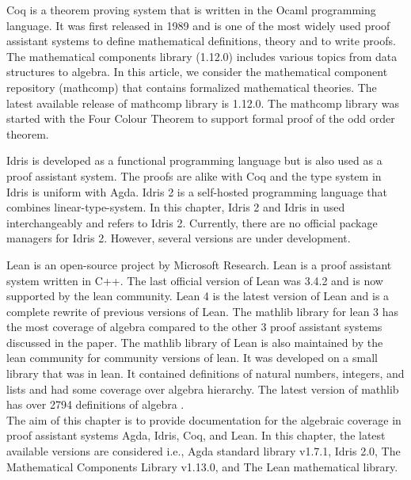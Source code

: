 Coq \cite{Paulin-Mohring2012} is a theorem proving system that is written in the
Ocaml programming language. It was first released in 1989 and is one of the most
widely used proof assistant systems to define mathematical definitions, theory
and to write proofs. The mathematical components library (1.12.0) includes
various topics from data structures to algebra. In this article, we consider the
mathematical component repository (mathcomp) that contains formalized
mathematical theories. \cite{assia_mahboubi_2021_4457887} The latest available
release of mathcomp library is 1.12.0. The mathcomp library was started with the
Four Colour Theorem to support formal proof of the odd order theorem. 

Idris is developed as a functional programming language but is also used as a
proof assistant system. The proofs are alike with Coq and the type system in
Idris is uniform with Agda. Idris 2 is a self-hosted programming language that
combines linear-type-system. In this chapter, Idris 2 and Idris in used
interchangeably and refers to Idris 2. Currently, there are no official package
managers for Idris 2. However, several versions are under development. 

Lean \cite{10.1145/3372885.3373824} is an open-source project by Microsoft
Research. Lean is a proof assistant system written in C++. The last official
version of Lean was 3.4.2 and is now supported by the lean community. Lean 4 is
the latest version of Lean and is a complete rewrite of previous versions of
Lean. The mathlib \cite{10.1145/3372885.3373824} library for lean 3 has the most
coverage of algebra compared to the other 3 proof assistant systems discussed in
the paper. The mathlib library of Lean is also maintained by the lean community
for community versions of lean. It was developed on a small library that was in
lean. It contained definitions of natural numbers, integers, and lists and had
some coverage over algebra hierarchy. The latest version of mathlib has over
2794 definitions of algebra \cite{2019arXiv191203028S}. \\

The aim of this chapter is to provide documentation for the algebraic coverage
in proof assistant systems Agda, Idris, Coq, and Lean. In this chapter, the
latest available versions are considered i.e., Agda standard library v1.7.1, Idris
2.0, The Mathematical Components Library v1.13.0, and The Lean mathematical
library. 

